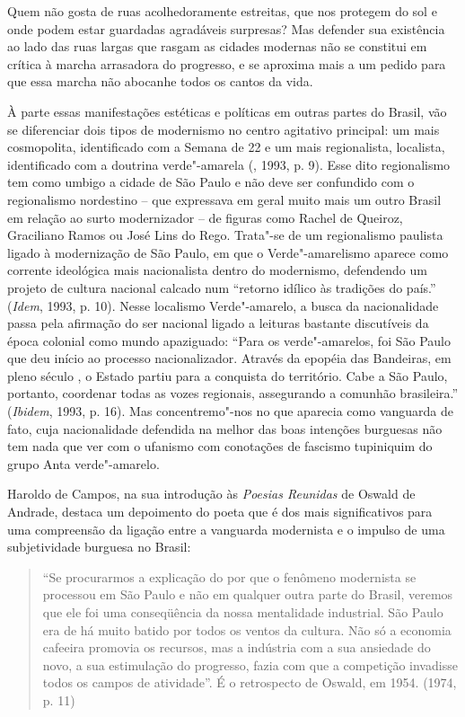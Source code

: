 {Quem não gosta de ruas acolhedoramente estreitas, que nos protegem do
sol e onde podem estar guardadas agradáveis surpresas? Mas defender sua
existência ao lado das ruas largas que rasgam as cidades modernas não se
constitui em crítica à marcha arrasadora do progresso, e se aproxima
mais a um pedido para que essa marcha não abocanhe todos os cantos da
vida.

À parte essas manifestações estéticas e políticas em outras partes do
Brasil, vão se diferenciar dois tipos de modernismo no centro agitativo
principal: um mais cosmopolita, identificado com a Semana de 22 e um
mais regionalista, localista, identificado com a doutrina verde"-amarela
(, 1993, p. 9). Esse dito regionalismo tem como umbigo a cidade
de São Paulo e não deve ser confundido com o regionalismo nordestino --
que expressava em geral muito mais um outro Brasil em relação ao surto
modernizador -- de figuras como Rachel de Queiroz, Graciliano Ramos ou
José Lins do Rego. Trata"-se de um regionalismo paulista ligado à
modernização de São Paulo, em que o Verde"-amarelismo aparece como
corrente ideológica mais nacionalista dentro do modernismo, defendendo
um projeto de cultura nacional calcado num ``retorno idílico às
tradições do país.'' (\emph{Idem}, 1993, p. 10). Nesse localismo
Verde"-amarelo, a busca da nacionalidade passa pela afirmação do ser
nacional ligado a leituras bastante discutíveis da época colonial como
mundo apaziguado: ``Para os verde"-amarelos, foi São Paulo que deu início
ao processo nacionalizador. Através da epopéia das Bandeiras, em pleno
século , o Estado partiu para a conquista do território. Cabe a São
Paulo, portanto, coordenar todas as vozes regionais, assegurando a
comunhão brasileira.'' (\emph{Ibidem}, 1993, p. 16). Mas concentremo"-nos
no que aparecia como vanguarda de fato, cuja nacionalidade defendida na
melhor das boas intenções burguesas não tem nada que ver com o ufanismo
com conotações de fascismo tupiniquim do grupo Anta verde"-amarelo.

Haroldo de Campos, na sua introdução às \emph{Poesias Reunidas} de
Oswald de Andrade, destaca um depoimento do poeta que é dos mais
significativos para uma compreensão da ligação entre a vanguarda
modernista e o impulso de uma subjetividade burguesa no Brasil:

\begin{quote}
``Se procurarmos a explicação do por que o fenômeno modernista se
processou em São Paulo e não em qualquer outra parte do Brasil, veremos
que ele foi uma conseqüência da nossa mentalidade industrial. São Paulo
era de há muito batido por todos os ventos da cultura. Não só a economia
cafeeira promovia os recursos, mas a indústria com a sua ansiedade do
novo, a sua estimulação do progresso, fazia com que a competição
invadisse todos os campos de atividade''. É o retrospecto de Oswald, em
1954. (1974, p. 11)
\end{quote}

}
